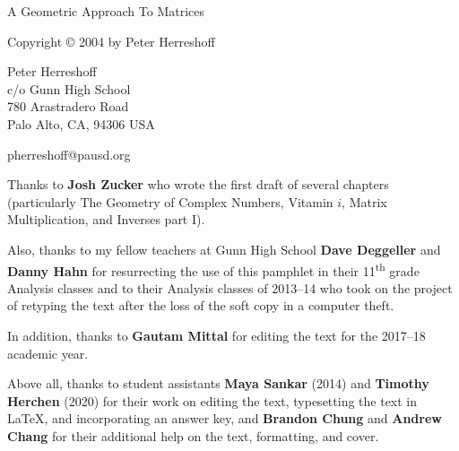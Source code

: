 \documentclass[../gatm.tex]{subfiles}
\begin{document}
\newcommand\dnew{\vspace{1cm}}

\begin{center}
	\vspace*{\fill}

	\doublespacing
	A Geometric Approach To Matrices

	Copyright \copyright{} 2004 by Peter Herreshoff  %

	\vspace{1cm}

	Peter Herreshoff\\
	c/o Gunn High School\\
	780 Arastradero Road\\
	Palo Alto, CA, 94306 USA

	\vspace{.5cm}

	pherreshoff@pausd.org

	\vspace{1cm}
\end{center}

\noindent Thanks to \textbf{Josh Zucker} who wrote the first draft of several chapters (particularly The Geometry of Complex Numbers, Vitamin $i$, Matrix Multiplication, and Inverses part I).

Also, thanks to my fellow teachers at Gunn High School \textbf{Dave Deggeller} and \textbf{Danny Hahn} for resurrecting the use of this pamphlet in their 11\textsuperscript{th} grade Analysis classes and to their Analysis classes of 2013--14 who took on the project of retyping the text after the loss of the soft copy in a computer theft.

In addition, thanks to \textbf{Gautam Mittal} for editing the text for the 2017--18 academic year.

Above all, thanks to student assistants \textbf{Maya Sankar} (2014) and \textbf{Timothy Herchen} (2020) for their work on editing the text, typesetting the text in \LaTeX{}, and incorporating an answer key, and \textbf{Brandon Chung} and \textbf{Andrew Chang} for their additional help on the text, formatting, and cover.

\vspace*{\fill}
\end{document}
